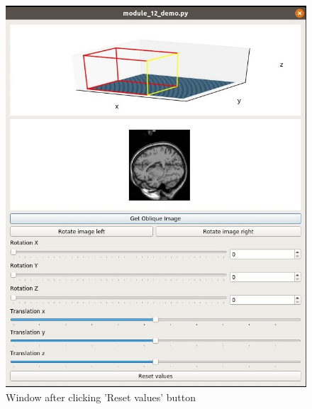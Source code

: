 \begin{figure}[H]
\centering{}\includegraphics[scale=0.7]{figures/module_12/mod12res}\caption{Window after clicking 'Reset values' button\label{fig:figures/module_12/Preprocessing}}
\end{figure}

